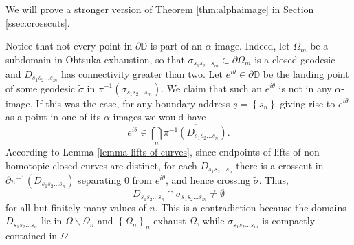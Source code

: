 \documentclass[11pt,a4paper,reqno]{amsart}
\theoremstyle{plain}
\theoremstyle{definition}
\theoremstyle{plain}
\def\DD{\mathbb{D}}
\begin{document}
We will prove a stronger version of Theorem \ref{thm:alphaimage} in Section \ref{ssec:crosscuts}.

 Notice that not every point in $\partial\DD$ is part of an $\alpha$-image. Indeed, let $ \Omega_m $ be a subdomain in Ohtsuka exhaustion, so that $ \sigma_{s_1s_2\dots s_m} \subset \partial  \Omega_m$ is a closed geodesic and $ D_{s_1s_2\dots s_m} $ has connectivity greater than two. Let $e^{i\theta}\in\partial \mathbb{D}$ be the landing point of some geodesic $ \widetilde{\sigma} $ in $\pi^{-1}(\sigma_{s_1s_2\dots s_m})$. We claim that such an $e^{i\theta}$ is not in any $ \alpha $-image. If this was the case, for any boundary address $\underline{s} = \left\lbrace s_n\right\rbrace $ giving rise to $e^{i\theta}$ as a point in one of its $\alpha$-images we would have $$e^{i\theta}\in \bigcap_{n} \overline{\pi^{-1}(D_{s_1s_2\dots s_n})}.$$ According to Lemma \ref{lemma-lifts-of-curves}, since endpoints of lifts of non-homotopic closed curves are distinct, for each $ D_{s_1s_2\dots s_n} $ there is a crosscut in $ \partial \pi^{-1}(D_{s_1s_2\dots s_n}) $ separating 0 from $ e^{i\theta} $, and hence crossing $ \widetilde{\sigma} $. Thus,
  $$D_{s_1s_2\dots s_n}\cap \sigma_{s_1s_2\dots s_m}  \neq\emptyset$$ for all but finitely many values of $n$. This is a contradiction because the domains $  D_{s_1s_2\dots s_n}$ lie in $ \Omega\smallsetminus\Omega_n $ and $ \left\lbrace \Omega_n\right\rbrace _n $ exhaust $ \Omega $, while $ \sigma_{s_1s_2\dots s_m} $ is compactly contained in $ \Omega $. 
  
\end{document}
